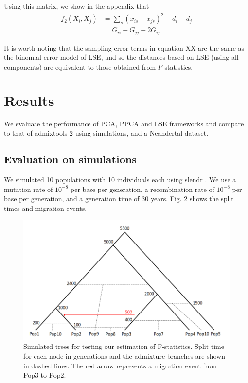 \documentclass[12pt, letterpaper]{article}
\begin{document}
Using this matrix, we show in the appendix that 
\begin{align}
    f_2(X_i, X_j) &= \sum_s (x_{is} - x_{js})^2 - d_i - d_j \nonumber\\
    &= G_{ii} + G_{jj} - 2 G_{ij}
\end{align}

It is worth noting that the sampling error terms in equation XX are the same as the binomial error model of LSE, and so the distances based on LSE (using all components) are equivalent to those obtained from $F$-statistics.

\section{Results}

We evaluate the performance of PCA, PPCA and LSE frameworks and compare to that of admixtools 2 using simulations, and a Neandertal dataset. 

\subsection{Evaluation on simulations}
We simulated 10 populations with 10 individuals each using slendr \cite{petr_slendr_2022}. We use a mutation rate of $10^{-8}$ per base per generation, a recombination rate of $10^{-8}$ per base per generation, and a generation time of 30 years. Fig. 2 shows the split times and migration events. 

\begin{figure}[ht!]
    \includegraphics[width=16.5cm]{inkscape/sim1.png}
    \centering
    \caption{Simulated trees for testing our estimation of F-statistics. Split time for each node in generations and the admixture branches are shown in dashed lines. The red arrow represents a migration event from Pop3 to Pop2.}
    \label{fig2:sim}
\end{figure}
\end{document}
